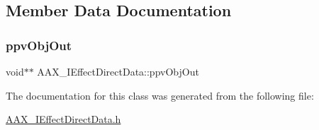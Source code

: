 \subsection{Member Data Documentation}
\mbox{\label{a01817_a365297b233c5341a924e74d758dc2b5d}} 
\subsubsection{\texorpdfstring{ppvObjOut}{ppvObjOut}}
{\footnotesize\ttfamily void$\ast$$\ast$ A\+A\+X\+\_\+\+I\+Effect\+Direct\+Data\+::ppv\+Obj\+Out}



The documentation for this class was generated from the following file\+:\begin{DoxyCompactItemize}
\item 
\mbox{\hyperlink{a00593}{A\+A\+X\+\_\+\+I\+Effect\+Direct\+Data.\+h}}\end{DoxyCompactItemize}
